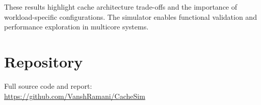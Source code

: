 \documentclass[11pt]{article}
\begin{document}
These results highlight cache architecture trade-offs and the importance of workload-specific configurations. The simulator enables functional validation and performance exploration in multicore systems.

\section{Repository}\nopagebreak
Full source code and report: \\
\url{https://github.com/VanshRamani/CacheSim}
\end{document}
